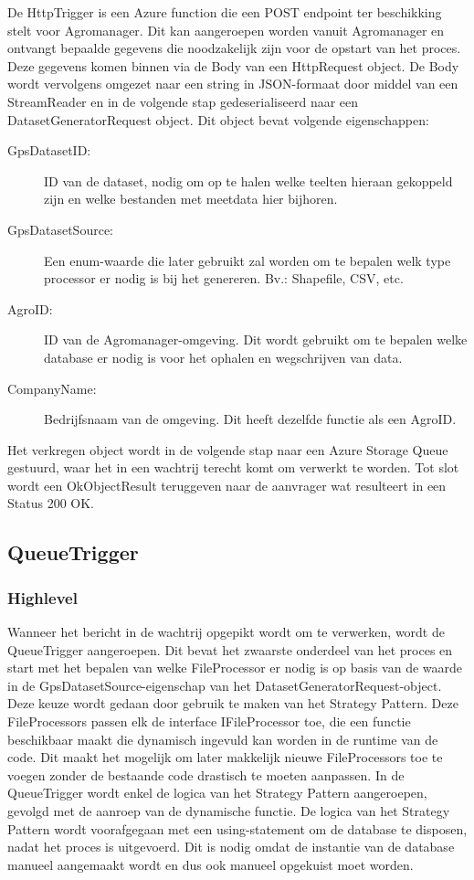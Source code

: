 De HttpTrigger is een Azure function die een POST endpoint ter beschikking stelt voor Agromanager. Dit kan aangeroepen worden vanuit Agromanager en ontvangt bepaalde gegevens die noodzakelijk zijn voor de opstart van het proces. Deze gegevens komen binnen via de Body van een HttpRequest object. De Body wordt vervolgens omgezet naar een string in JSON-formaat door middel van een StreamReader en in de volgende stap gedeserialiseerd naar een DatasetGeneratorRequest object. Dit object bevat volgende eigenschappen:
\begin{description}
    \item [GpsDatasetID:] 
    ID van de dataset, nodig om op te halen welke teelten hieraan gekoppeld zijn en welke bestanden met meetdata hier bijhoren.
    \item[GpsDatasetSource:] 
    Een enum-waarde die later gebruikt zal worden om te bepalen welk type processor er nodig is bij het genereren. Bv.: Shapefile, CSV, etc.
    \item[AgroID:] 
    ID van de Agromanager-omgeving. Dit wordt gebruikt om te bepalen welke database er nodig is voor het ophalen en wegschrijven van data.
    \item[CompanyName:] 
    Bedrijfsnaam van de omgeving. Dit heeft dezelfde functie als een AgroID.
\end{description}

Het verkregen object wordt in de volgende stap naar een Azure Storage Queue gestuurd, waar het in een wachtrij terecht komt om verwerkt te worden. Tot slot wordt een OkObjectResult teruggeven naar de aanvrager wat resulteert in een Status 200 OK.

\subsection{QueueTrigger}

\subsubsection*{Highlevel}

Wanneer het bericht in de wachtrij opgepikt wordt om te verwerken, wordt de QueueTrigger aangeroepen. Dit bevat het zwaarste onderdeel van het proces en start met het bepalen van welke FileProcessor er nodig is op basis van de waarde in de GpsDatasetSource-eigenschap van het DatasetGeneratorRequest-object. Deze keuze wordt gedaan door gebruik te maken van het Strategy Pattern. Deze FileProcessors passen elk de interface IFileProcessor toe, die een functie beschikbaar maakt die dynamisch ingevuld kan worden in de runtime van de code. Dit maakt het mogelijk om later makkelijk nieuwe FileProcessors toe te voegen zonder de bestaande code drastisch te moeten aanpassen. In de QueueTrigger wordt enkel de logica van het Strategy Pattern aangeroepen, gevolgd met de aanroep van de dynamische functie. De logica van het Strategy Pattern wordt voorafgegaan met een using-statement om de database te disposen, nadat het proces is uitgevoerd. Dit is nodig omdat de instantie van de database manueel aangemaakt wordt en dus ook manueel opgekuist moet worden. 

